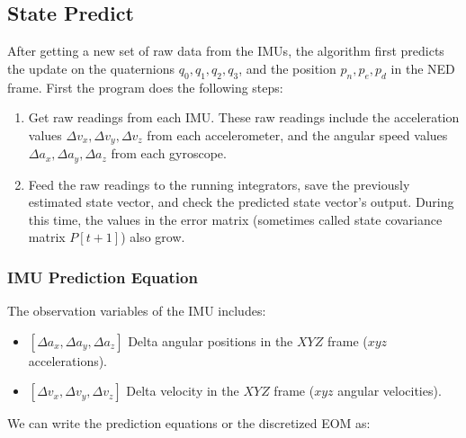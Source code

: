 \subsection{State Predict}

After getting a new set of raw data from the IMUs, the algorithm first predicts the update on the quaternions $q_0,q_1,q_2,q_3$, and the position $p_n,p_e,p_d$ in the NED frame. First the program does the following steps:

\begin{enumerate}
    \item Get raw readings from each IMU. These raw readings include the acceleration values $\Delta v_x, \Delta v_y, \Delta v_z$ from each accelerometer, and the angular speed values $\Delta a_x, \Delta a_y, \Delta a_z$ from each gyroscope.
    \item Feed the raw readings to the running integrators, save the previously estimated state vector, and check the predicted state vector's output. During this time, the values in the error matrix (sometimes called state covariance matrix $P[t+1]$) also grow.
\end{enumerate}

\subsubsection{IMU Prediction Equation}

The observation variables of the IMU includes:

\begin{itemize}
    \item $[\Delta a_x, \Delta a_y, \Delta a_z]$ Delta angular positions in the $XYZ$ frame ($xyz$ accelerations).
    \item $[\Delta v_x, \Delta v_y, \Delta v_z]$ Delta velocity in the $XYZ$ frame ($xyz$ angular velocities).
\end{itemize}

We can write the prediction equations or the discretized EOM as:

